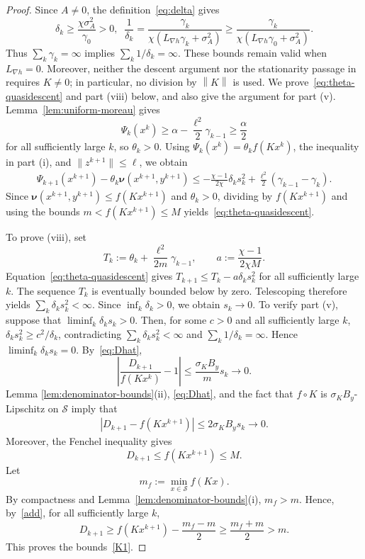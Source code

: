 \documentclass[9pt]{article}
\numberwithin{equation}{section}
\theoremstyle{definition}
\theoremstyle{remark}
\newcommand{\Sset}{\mathcal S}
\newcommand{\norm}[1]{\left\lVert #1\right\rVert}
\newcommand{\nuf}{\boldsymbol\nu}
\begin{document}
\begin{proof}
Since $A\ne0$, the definition~\eqref{eq:delta} gives
$$
 \delta_k\geq\frac{\chi\sigma_A^2}{\gamma_0}>0,\;\;
 \frac1{\delta_k}
 =\frac{\gamma_k}{\chi(L_{\nabla h}\gamma_k+\sigma_A^2)}
 \geq\frac{\gamma_k}{\chi(L_{\nabla h}\gamma_0+\sigma_A^2)}.
$$
Thus $\sum_k\gamma_k=\infty$ implies $\sum_k1/\delta_k=\infty$.
These bounds remain valid when $L_{\nabla h}=0$. Moreover, neither
the descent argument nor the stationarity passage in
\cite[Theorem~2.6]{Tao2026} requires $K\ne0$; in particular, no
division by $\norm K$ is used.
We prove~\eqref{eq:theta-quasidescent} and part (viii) below,
and also give the argument for part (v).
Lemma~\ref{lem:uniform-moreau} gives
\[
 \Psi_k(x^k)\geq\alpha-\frac{\ell^2}{2}\gamma_{k-1}
 \geq\frac\alpha2
\]
for all sufficiently large $k$, so $\theta_k>0$.
Using $\Psi_k(x^k)=\theta_k f(Kx^k)$, the inequality in part (i),
and $\|z^{k+1}\|\leq\ell$, we obtain
\begin{eqnarray}\label{eq:basic-residual-descent}
 \Psi_{k+1}(x^{k+1})-\theta_k\nuf(x^{k+1},y^{k+1})
 \leq-\frac{\chi-1}{2\chi}\delta_ks_k^2
       +\frac{\ell^2}{2}(\gamma_{k-1}-\gamma_k).
\end{eqnarray}
Since $\nuf(x^{k+1},y^{k+1})\leq f(Kx^{k+1})$ and $\theta_k>0$,
dividing by $f(Kx^{k+1})$ and using the bounds
$m<f(Kx^{k+1})\leq M$ yields~\eqref{eq:theta-quasidescent}.

To prove (viii), set
$$
 T_k:=\theta_k+\frac{\ell^2}{2m}\gamma_{k-1},
 \qquad a:=\frac{\chi-1}{2\chi M}.
$$
Equation~\eqref{eq:theta-quasidescent} gives
$T_{k+1}\leq T_k-a\delta_ks_k^2$ for all sufficiently large $k$.
The sequence $T_k$ is eventually bounded below by zero.
Telescoping therefore yields $\sum_k\delta_ks_k^2<\infty$.
Since $\inf_k\delta_k>0$, we obtain $s_k\to0$.
To verify part (v), suppose that $\liminf_k\delta_ks_k>0$.
Then, for some $c>0$ and all sufficiently large $k$,
$\delta_ks_k^2\geq c^2/\delta_k$, contradicting
$\sum_k\delta_ks_k^2<\infty$ and $\sum_k1/\delta_k=\infty$.
Hence $\liminf_k\delta_ks_k=0$.
By~\eqref{eq:Dhat},
$$
 \left|\frac{D_{k+1}}{f(Kx^k)}-1\right|
 \leq\frac{\sigma_KB_y}{m}s_k\longrightarrow0.
$$
Lemma \ref{lem:denominator-bounds}(ii), \eqref{eq:Dhat}, and the fact that
$f\circ K$ is $\sigma_KB_y$-Lipschitz on $\Sset$ imply that
\begin{eqnarray}\label{add}
 |D_{k+1}-f(Kx^{k+1})|
 \leq 2\sigma_KB_y s_k\longrightarrow0.
\end{eqnarray}
Moreover, the Fenchel inequality gives
\[
 D_{k+1}\leq f(Kx^{k+1})\leq M.
\]
Let
\[
 m_f:=\min_{x\in\Sset} f(Kx).
\]
By compactness and Lemma~\ref{lem:denominator-bounds}(i), $m_f>m$.
Hence, by~\eqref{add}, for all sufficiently large $k$,
\[
 D_{k+1}\geq f(Kx^{k+1})-\frac{m_f-m}{2}
 \geq\frac{m_f+m}{2}>m.
\]
This proves the bounds~\eqref{K1}.


\end{proof}
\end{document}
